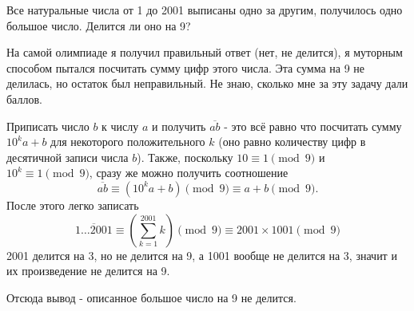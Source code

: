 \documentclass[12pt, a4paper]{article}
\newcommand\pmn{\pmod {9}}
\begin{document}
Все натуральные числа от 1 до 2001 выписаны одно за другим, получилось одно большое число.
Делится ли оно на 9?


На самой олимпиаде я получил правильный ответ (нет, не делится), я муторным способом пытался посчитать сумму цифр этого числа.
Эта сумма на 9 не делилась, но остаток был неправильный.
Не знаю, сколько мне за эту задачу дали баллов.


Приписать число $b$ к числу $a$ и получить $\overline{ab}$ - это всё равно что посчитать сумму $10^ka+b$ для некоторого положительного $k$
(оно равно количеству цифр в десятичной записи числа $b$).
Также, поскольку $10\equiv1\pmn$ и $10^k\equiv1\pmn$, сразу же можно получить соотношение
\[
\overline{ab}\equiv (10^ka+ b)\pmn \equiv a+b \pmn.
\]
После этого легко записать
\[
\overline{1\ldots 2001} \equiv \left(\sum_{k=1}^{2001}k\right) \pmn \equiv  2001\times 1001 \pmn 
\]
2001 делится на 3, но не делится на 9, а 1001 вообще не делится на 3, значит и их произведение не делится на 9.

Отсюда вывод - описанное большое число на 9 не делится.
\end{document}
